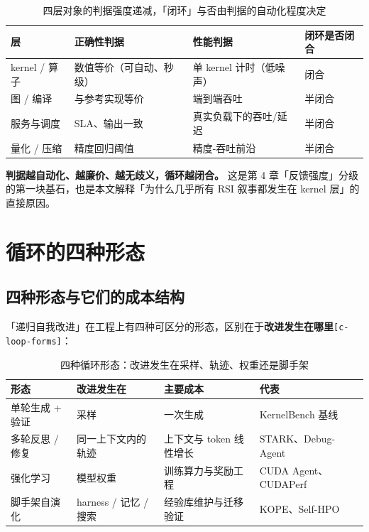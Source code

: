 \begin{table}[t]
\centering
\footnotesize
\setlength{\tabcolsep}{4pt}
\caption{四层对象的判据强度递减，「闭环」与否由判据的自动化程度决定}
\label{tab:2}
\begin{tabular}{llll}
\toprule
层 & 正确性判据 & 性能判据 & 闭环是否闭合 \\
\midrule
kernel / 算子 & 数值等价（可自动、秒级） & 单 kernel 计时（低噪声） & 闭合 \\
图 / 编译 & 与参考实现等价 & 端到端吞吐 & 半闭合 \\
服务与调度 & SLA、输出一致 & 真实负载下的吞吐/延迟 & 半闭合 \\
量化 / 压缩 & 精度回归阈值 & 精度-吞吐前沿 & 半闭合 \\
\bottomrule
\end{tabular}
\end{table}

\textbf{判据越自动化、越廉价、越无歧义，循环越闭合。} 这是第 4 章「反馈强度」分级的第一块基石，也是本文解释「为什么几乎所有 RSI 叙事都发生在 kernel 层」的直接原因。


\section{循环的四种形态}

\subsection{四种形态与它们的成本结构}

「递归自我改进」在工程上有四种可区分的形态，区别在于\textbf{改进发生在哪里}{\scriptsize\texttt{[c-\hspace{0pt}loop-\hspace{0pt}forms]}}：


\begin{table}[t]
\centering
\footnotesize
\setlength{\tabcolsep}{4pt}
\caption{四种循环形态：改进发生在采样、轨迹、权重还是脚手架}
\label{tab:3}
\begin{tabular}{llll}
\toprule
形态 & 改进发生在 & 主要成本 & 代表 \\
\midrule
单轮生成 + 验证 & 采样 & 一次生成 & KernelBench 基线 \\
多轮反思 / 修复 & 同一上下文内的轨迹 & 上下文与 token 线性增长 & STARK、Debug-Agent \\
强化学习 & 模型权重 & 训练算力与奖励工程 & CUDA Agent、CUDAPerf \\
脚手架自演化 & harness / 记忆 / 搜索 & 经验库维护与迁移验证 & KOPE、Self-HPO \\
\bottomrule
\end{tabular}
\end{table}

